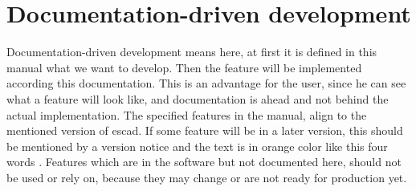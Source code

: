 \documentclass[a4paper, 12pt, openany]{scrbook}
\begin{document}
\section{Documentation-driven development}\label{sec:ddd}
Documentation-driven development means here, at first it is defined in this manual what we want to develop. Then the feature will be implemented according this documentation. This is an advantage for the user, since he can see what a feature will look like, and documentation is ahead and not behind the actual implementation. The specified features in the manual, align to the mentioned version of escad. If some feature will be in a later version, this should be mentioned by a version notice and the text is in orange color \color{orange} like this four words \color{black}. Features which are in the software but not documented here, should not be used or rely on, because they may change or are not ready for production yet.
\end{document}
